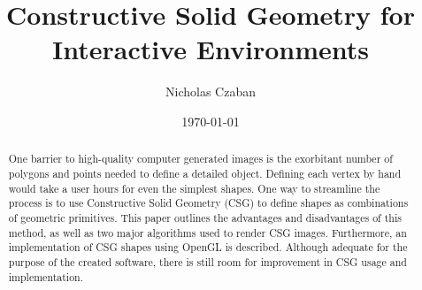 \documentclass[12pt]{article}
\begin{document}
\begin{titlepage}
\title{Constructive Solid Geometry for Interactive Environments}
\author{Nicholas Czaban}
\date{\today}
\maketitle
\end{titlepage}
\begin{onehalfspace}
\tableofcontents
\listoffigures
\begin{abstract}
  One barrier to high-quality computer generated images is the exorbitant number of polygons and points needed to define a detailed object. Defining each vertex by hand would take a user hours for even the simplest shapes. One way to streamline the process is to use Constructive Solid Geometry (CSG) to define shapes as combinations of geometric primitives. This paper outlines the advantages and disadvantages of this method, as well as two major algorithms used to render CSG images. Furthermore, an implementation of CSG shapes using OpenGL is described. Although adequate for the purpose of the created software, there is still room for improvement in CSG usage and implementation.
\end{abstract}
\newpage
\end{onehalfspace}
\end{document}
